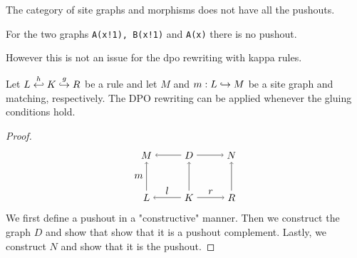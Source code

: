 The category of site graphs and morphisms does not have all the pushouts. %

\begin{example}
  For the two graphs \verb|A(x!1), B(x!1)| and \verb|A(x)| there is no pushout.
\end{example}

However this is not an issue for the dpo rewriting with kappa rules.

\begin{lemma}
  Let $L\overset{h}{\hookleftarrow} K \overset{g}{\hookrightarrow} R$ be a rule and let $M$ and $m:L\hookrightarrow M$ be a site graph and matching, respectively. The DPO rewriting can be applied whenever the gluing conditions hold.
\end{lemma}
\begin{proof}
  \[
  \begin{tikzpicture} %
    \node (l) at (-1.5,0) {\(L\)};
    \node (d) at (0,0) {\(K\)};
    \node (r) at (1.5,0) {\(R\)};
    \node (m) at (-1.5,1.5) {\(M\)};
    \node (d') at (0,1.5) {\(D\)};
    \node (n) at (1.5,1.5) {\(N\)};
    \draw [->] (d) -- node [above,midway] {\(l\)} (l);
    \draw [->] (d) -- node [above,midway] {\(r\)} (r);
    \draw [->] (d') -- (m);
    \draw [->] (d') -- (n);
    \draw [->] (l) -- node [left,midway] {\(m\)}  (m);
    \draw [->] (d) -- (d');
    \draw [->] (r) -- (n);
  \end{tikzpicture}
  \]
  We first define a pushout in a "constructive" manner. Then we construct the graph $D$ and show that show that it is a pushout complement. Lastly, we construct $N$ and show that it is the pushout.


\end{proof}

